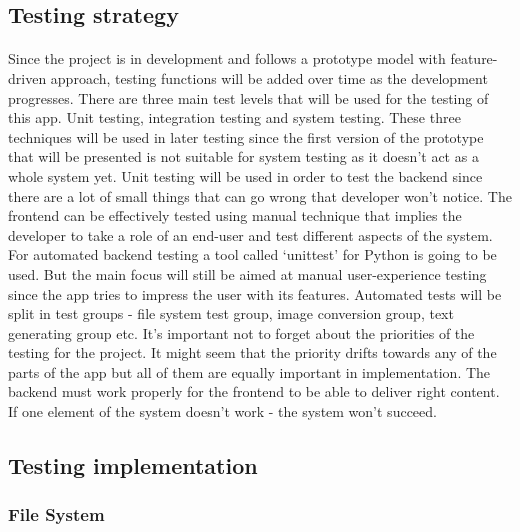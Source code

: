 \documentclass[12pt]{report}
\begin{document}
    \subsection*{Testing strategy}
    \paragraph{}

    Since the project is in development and follows a prototype model with feature-driven approach, testing functions will be added over time as the development progresses. There are three main test levels that will be used for the testing of this app.
    Unit testing, integration testing and system testing. These three techniques will be used in later testing since the first version of the prototype that will be presented is not suitable for system testing as it doesn't act as a whole system yet.
    Unit testing will be used in order to test the backend since there are a lot of small things that can go wrong that developer won't notice. The frontend can be effectively tested using manual technique that implies the developer to take a role of an end-user and test different aspects of the system.
    For automated backend testing a tool called `unittest' for Python is going to be used. But the main focus will still be aimed at manual user-experience testing since the app tries to impress the user with its features. Automated tests will be split in test groups - file system test group, image conversion group, text generating group etc.
    It's important not to forget about the priorities of the testing for the project. It might seem that the priority drifts towards any of the parts of the app but all of them are equally important in implementation. The backend must work properly for the frontend to be able to deliver right content. If one element of the system doesn't work - the system won't succeed.

    \subsection*{Testing implementation}

    \subsubsection*{File System}
    \paragraph{}
\end{document}
